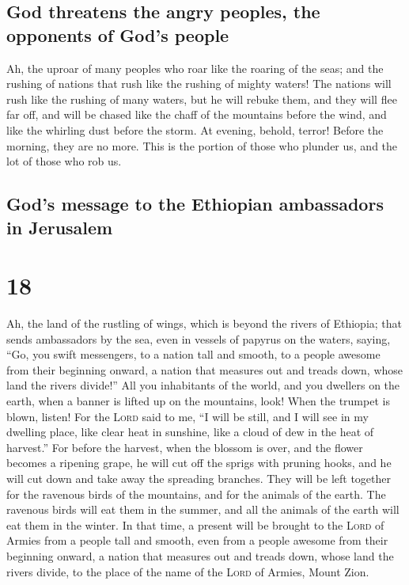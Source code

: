 \hypertarget{god-threatens-the-angry-peoples-the-opponents-of-gods-people}{%
\subsection{God threatens the angry peoples, the opponents of God's
people}\label{god-threatens-the-angry-peoples-the-opponents-of-gods-people}}

 Ah, the uproar of many peoples who roar like the roaring
of the seas; and the rushing of nations that rush like the rushing of
mighty waters!  The nations will rush like the rushing of
many waters, but he will rebuke them, and they will flee far off, and
will be chased like the chaff of the mountains before the wind, and like
the whirling dust before the storm.  At evening, behold,
terror! Before the morning, they are no more. This is the portion of
those who plunder us, and the lot of those who rob us.

\hypertarget{gods-message-to-the-ethiopian-ambassadors-in-jerusalem}{%
\subsection{God's message to the Ethiopian ambassadors in
Jerusalem}\label{gods-message-to-the-ethiopian-ambassadors-in-jerusalem}}

\hypertarget{section-17}{%
\section{18}\label{section-17}}

 Ah, the land of the rustling of wings, which is beyond
the rivers of Ethiopia;  that sends ambassadors by the
sea, even in vessels of papyrus on the waters, saying, ``Go, you swift
messengers, to a nation tall and smooth, to a people awesome from their
beginning onward, a nation that measures out and treads down, whose land
the rivers divide!''  All you inhabitants of the world,
and you dwellers on the earth, when a banner is lifted up on the
mountains, look! When the trumpet is blown, listen!  For
the \textsc{Lord} said to me, ``I will be still, and I will see in my
dwelling place, like clear heat in sunshine, like a cloud of dew in the
heat of harvest.''  For before the harvest, when the
blossom is over, and the flower becomes a ripening grape, he will cut
off the sprigs with pruning hooks, and he will cut down and take away
the spreading branches.  They will be left together for
the ravenous birds of the mountains, and for the animals of the earth.
The ravenous birds will eat them in the summer, and all the animals of
the earth will eat them in the winter.  In that time, a
present will be brought to the \textsc{Lord} of Armies from a people
tall and smooth, even from a people awesome from their beginning onward,
a nation that measures out and treads down, whose land the rivers
divide, to the place of the name of the \textsc{Lord} of Armies, Mount
Zion.


